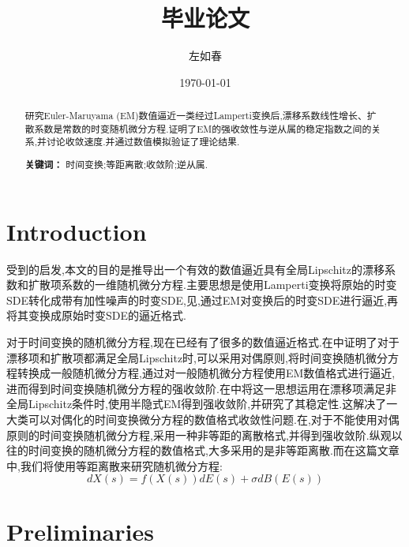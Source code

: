 \documentclass[12pt,final]{article}
\title{毕业论文}
\author{左如春}
\date{\today}
\numberwithin{equation}{section}
\numberwithin{figure}{section}
\numberwithin{table}{section}
\theoremstyle{plain}
\theoremstyle{definition}
\theoremstyle{remark}
\begin{document}
\maketitle

\begin{abstract}
研究Euler-Maruyama (EM)数值逼近一类经过Lamperti变换后,漂移系数线性增长、扩散系数是常数的时变随机微分方程.证明了EM的强收敛性与逆从属的稳定指数之间的关系,并讨论收敛速度.并通过数值模拟验证了理论结果.

\medskip
\noindent\textbf{关键词：} 时间变换;等距离散;收敛阶;逆从属.
\end{abstract}





\section{Introduction}

受到\cite{Alfonsi2013602}的启发,本文的目的是推导出一个有效的数值逼近具有全局Lipschitz的漂移系数和扩散项系数的一维随机微分方程.主要思想是使用Lamperti变换将原始的时变SDE转化成带有加性噪声的时变SDE,见\cite{iacus2008simulation},通过EM对变换后的时变SDE进行逼近,再将其变换成原始时变SDE的逼近格式.

对于时间变换的随机微分方程,现在已经有了很多的数值逼近格式.在\cite{jum2014strong}中证明了对于漂移项和扩散项都满足全局Lipschitz时,可以采用对偶原则,将时间变换随机微分方程转换成一般随机微分方程,通过对一般随机微分方程使用EM数值格式进行逼近,进而得到时间变换随机微分方程的强收敛阶.在\cite{deng2020semi}中将这一思想运用在漂移项满足非全局Lipschitz条件时,使用半隐式EM得到强收敛阶,并研究了其稳定性.这解决了一大类可以对偶化的时间变换微分方程的数值格式收敛性问题.在\cite{jin2019strong},对于不能使用对偶原则的时间变换随机微分方程,采用一种非等距的离散格式,并得到强收敛阶.纵观以往的时间变换的随机微分方程的数值格式,大多采用的是非等距离散.而在这篇文章中,我们将使用等距离散来研究随机微分方程:
\begin{equation}\label{basic SDE}
	dX(s)=f(X(s))dE(s)+\sigma dB(E(s))
\end{equation}

\section{Preliminaries}
\end{document}
